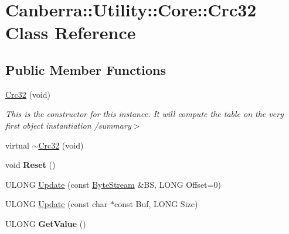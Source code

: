 \hypertarget{class_canberra_1_1_utility_1_1_core_1_1_crc32}{}\section{Canberra\+:\+:Utility\+:\+:Core\+:\+:Crc32 Class Reference}
\label{class_canberra_1_1_utility_1_1_core_1_1_crc32}
\subsection*{Public Member Functions}
\begin{DoxyCompactItemize}
\item 
\mbox{\label{class_canberra_1_1_utility_1_1_core_1_1_crc32_af4ac452fe8aa650741a10262535197e3}} 
\hyperlink{class_canberra_1_1_utility_1_1_core_1_1_crc32_af4ac452fe8aa650741a10262535197e3}{Crc32} (void)
\begin{DoxyCompactList}\small\item\em This is the constructor for this instance. It will compute the table on the very first object instantiation /summary$>$ \end{DoxyCompactList}\item 
virtual \hyperlink{class_canberra_1_1_utility_1_1_core_1_1_crc32_ab7c891d5761030db006e9d888a256fbd_ab7c891d5761030db006e9d888a256fbd}{$\sim$\+Crc32} (void)
\item 
\mbox{\label{class_canberra_1_1_utility_1_1_core_1_1_crc32_a7d109ce8e1198e26cd353da8e9a9dd62}} 
void {\bfseries Reset} ()
\item 
U\+L\+O\+NG \hyperlink{class_canberra_1_1_utility_1_1_core_1_1_crc32_a35635a2cd95023d7b01ccb9133361c23_a35635a2cd95023d7b01ccb9133361c23}{Update} (const \hyperlink{class_canberra_1_1_utility_1_1_core_1_1_byte_stream}{Byte\+Stream} \&BS, L\+O\+NG Offset=0)
\item 
U\+L\+O\+NG \hyperlink{class_canberra_1_1_utility_1_1_core_1_1_crc32_a06b897033aec857f2f821ba48668b8e1_a06b897033aec857f2f821ba48668b8e1}{Update} (const char $\ast$const Buf, L\+O\+NG Size)
\item 
\mbox{\label{class_canberra_1_1_utility_1_1_core_1_1_crc32_a292c0cafe7d61d1c51696517ba08ac39}} 
U\+L\+O\+NG {\bfseries Get\+Value} ()
\end{DoxyCompactItemize}
